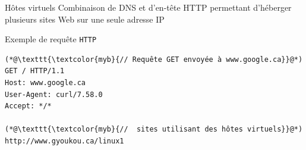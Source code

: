 \documentclass{report}
\begin{document}
\begin{multicols*}{3}
\begin{Definitionx}{Hôtes virtuels}{}
Combinaison de DNS et d'en-tête HTTP permettant d'héberger plusieurs sites Web sur une seule adresse IP   
\end{Definitionx}


\begin{EExample}{Exemple de requête \texttt{HTTP}  }{}
 \begin{lstlisting}
(*@\texttt{\textcolor{myb}{// Requête GET envoyée à www.google.ca}}@*)
GET / HTTP/1.1
Host: www.google.ca
User-Agent: curl/7.58.0
Accept: */*

(*@\texttt{\textcolor{myb}{//  sites utilisant des hôtes virtuels}}@*)
http://www.gyoukou.ca/linux1
\end{lstlisting}   
\end{EExample}

\end{multicols*}
    \footnotesize
\end{document}
